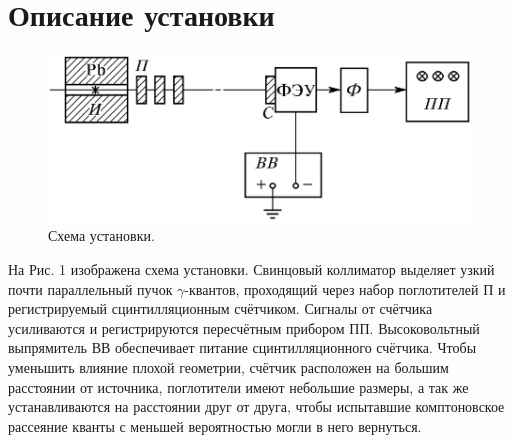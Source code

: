 \documentclass[a4paper,12pt]{article} %
\begin{document}
\section*{Описание установки}
\begin{figure}[h]
\includegraphics[scale=0.5]{1.png}
\centering
\caption{Схема установки.}
\end{figure}
На Рис. 1 изображена схема установки. Свинцовый коллиматор выделяет узкий почти параллельный пучок $\gamma$-квантов, проходящий через набор поглотителей П и регистрируемый сцинтилляционным счётчиком. Сигналы от счётчика усиливаются и регистрируются пересчётным прибором ПП. Высоковольтный выпрямитель ВВ обеспечивает питание сцинтилляционного счётчика. Чтобы уменьшить влияние плохой геометрии, счётчик расположен на большим расстоянии от источника, поглотители имеют небольшие размеры, а так же устанавливаются на расстоянии друг от друга, чтобы испытавшие комптоновское рассеяние кванты с меньшей вероятностью могли в него вернуться.


\end{document}
